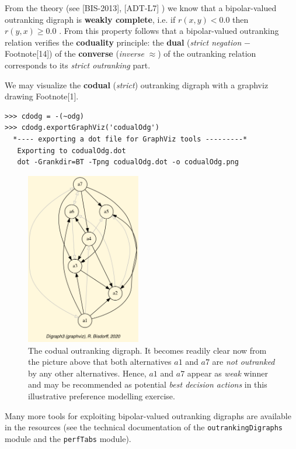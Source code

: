 From the theory (see [BIS-2013], [ADT-L7] ) we know that a bipolar-valued outranking digraph is {\bf weakly complete}, i.e. if $r(x,y) < 0.0$ then $r(y,x) \geq 0.0$ . From this property follows that a bipolar-valued outranking relation verifies the {\bf coduality} principle: the {\bf dual} ({\em strict negation\/} $-$ Footnote[14]) of the {\bf converse} ({\em inverse\/} $\approx$) of the outranking relation corresponds to its {\em strict outranking\/} part.

We may visualize the {\bf codual} ({\em strict\/}) outranking digraph with a graphviz drawing Footnote[1].

\begin{lstlisting}
>>> cdodg = -(~odg)
>>> cdodg.exportGraphViz('codualOdg')
  *---- exporting a dot file for GraphViz tools ---------*
   Exporting to codualOdg.dot
   dot -Grankdir=BT -Tpng codualOdg.dot -o codualOdg.png
\end{lstlisting}

\begin{figure}[h]
\sidecaption
\includegraphics[width=5cm]{Figures/codualOdg.png}
\caption{The codual outranking digraph. It becomes readily clear now from the picture above that both alternatives $a1$  and $a7$ are {\em not outranked\/} by any other alternatives. Hence, $a1$  and $a7$ appear as \emph{weak} \Condorcet winner and may be recommended as potential {\em best decision actions\/} in this illustrative preference modelling exercise.}
\label{fig:3.1}       %
\end{figure}
 
Many more tools for exploiting bipolar-valued outranking digraphs are available in the  resources (see the technical documentation of the {\tt outrankingDigraphs} module and the {\tt perfTabs} module).

 

